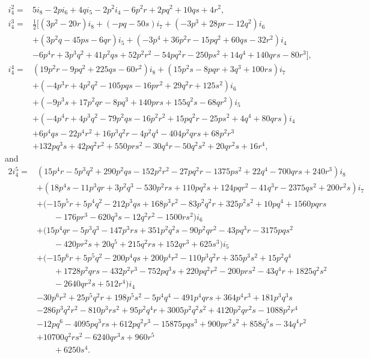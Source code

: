 \documentclass[11pt,a4paper,oneside]{article}
\newcommand{\ii}[1]{i_{#1}}
\begin{document}
\begin{align*}
\ii4^2={}&5\ii8-2p\ii6+4q\ii5-2p^2\ii4-6p^2r+2pq^2+10qs+4r^2,\\
\ii4^3={}&\frac12\bigl[(3p^2-20r)\ii8+(-pq-50s)\ii7
 +(-3p^3+28pr-12q^2)\ii6\\
& +(3p^2q-45ps-6qr)\ii5
 +(-3p^4+36p^2r-15pq^2+60qs-32r^2)\ii4\\
& -6p^4r+3p^3q^2+41p^2qs+52p^2r^2-54pq^2r-250ps^2
 +14q^4+140qrs-80r^3\bigr],\\
\ii4^4={}&(19p^2r-9pq^2+225qs-60r^2)\ii8
 +(15p^2s-8pqr+3q^3+100rs)\ii7\\
&+(-4p^3r+4p^2q^2-105pqs-16pr^2+29q^2r+125s^2)\ii6\\
&+(-9p^3s+17p^2qr-8pq^3+140prs+155q^2s-68qr^2)\ii5\\
&+(-4p^4r+4p^3q^2-79p^2qs-16p^2r^2+15pq^2r-25ps^2
  +4q^4+80qrs)\ii4\\
&+6p^4qs-22p^4r^2+16p^3q^2r-4p^2q^4-404p^2qrs+68p^2r^3\\
&+132pq^3s+42pq^2r^2+550prs^2-30q^4r-50q^2s^2+20qr^2s+16r^4,
\end{align*}
and
{\small
\begin{align*}
2\ii4^5={}&
(15p^4r-5p^3q^2+290p^2qs-152p^2r^2-27pq^2r-1375ps^2
 +22q^4-700qrs+240r^3)\ii8\\
&+(18p^4s-11p^3qr+3p^2q^3-530p^2rs+110pq^2s+124pqr^2
 -41q^3r-2375qs^2+200r^2s)\ii7\\
&+(-15p^5r+5p^4q^2-212p^3qs+168p^3r^2-83p^2q^2r
 +325p^2s^2+10pq^4+1560pqrs\\
&\qquad-176pr^3-620q^3s-12q^2r^2-1500rs^2)\ii6\\
&+(15p^4qr-5p^3q^3-147p^3rs+351p^2q^2s-90p^2qr^2
 -43pq^3r-3175pqs^2\\
&\qquad-420pr^2s+20q^5+215q^2rs+152qr^3+625s^3)\ii5\\
&+(-15p^6r+5p^5q^2-200p^4qs+200p^4r^2-110p^3q^2r
 +355p^3s^2+15p^2q^4\\
&\qquad+1728p^2qrs-432p^2r^3-752pq^3s+220pq^2r^2-200prs^2
 -43q^4r+1825q^2s^2\\
&\qquad-2640qr^2s+512r^4)\ii4\\
&-30p^6r^2+25p^5q^2r+198p^5s^2-5p^4q^4-491p^4qrs+364p^4r^3
 +181p^3q^3s\\
&-286p^3q^2r^2-810p^3rs^2+95p^2q^4r+3005p^2q^2s^2
 +4120p^2qr^2s-1088p^2r^4\\
&-12pq^6-4095pq^3rs+612pq^2r^3-15875pqs^3+900pr^2s^2
 +858q^5s-34q^4r^2\\
&+10700q^2rs^2-6240qr^3s+960r^5\\
&\qquad+6250s^4.
\end{align*}
}
\end{document}
